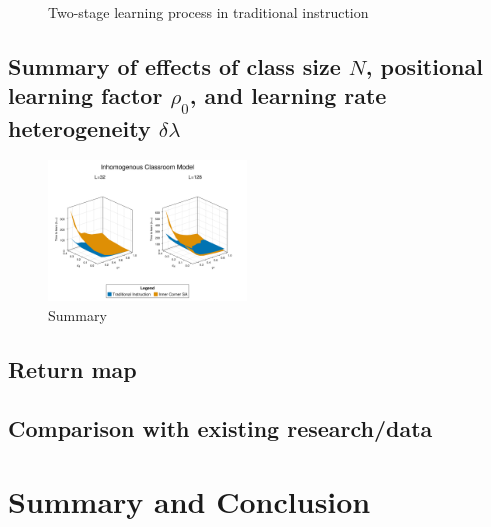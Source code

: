 \documentclass[twocolumn,secnumarabic,amssymb, nobibnotes, aps, prd]{revtex4-2}
\begin{document}
    \begin{figure}[htbp!]
        \centering
        \caption{Two-stage learning process in traditional instruction}
        \label{fig:two stage learning}
    \end{figure}


    \subsection{Summary of effects of class size $N$, positional learning factor $\rho_0$, and learning rate heterogeneity $\delta\lambda$}

    \begin{figure}[htbp!]
        \centering
        \includegraphics[width=0.47\textwidth]{figures/2D-BPCAIH-analysis/rho-dl-t plots/32-128 comparison.png}
        \caption{Summary}
        \label{fig:Params effect summary}
    \end{figure}
    
    \subsection{Return map}

    \subsection{Comparison with existing research/data}

\section{Summary and Conclusion}


\end{document}
